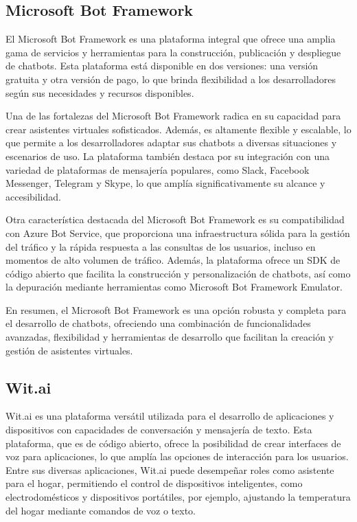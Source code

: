 \subsection{Microsoft Bot Framework}
El Microsoft Bot Framework es una plataforma integral que ofrece una amplia gama de servicios y herramientas para la construcción, publicación y despliegue de chatbots. Esta plataforma está disponible en dos versiones: una versión gratuita y otra versión de pago, lo que brinda flexibilidad a los desarrolladores según sus necesidades y recursos disponibles.

Una de las fortalezas del Microsoft Bot Framework radica en su capacidad para crear asistentes virtuales sofisticados. Además, es altamente flexible y escalable, lo que permite a los desarrolladores adaptar sus chatbots a diversas situaciones y escenarios de uso. La plataforma también destaca por su integración con una variedad de plataformas de mensajería populares, como Slack, Facebook Messenger, Telegram y Skype, lo que amplía significativamente su alcance y accesibilidad.

Otra característica destacada del Microsoft Bot Framework es su compatibilidad con Azure Bot Service, que proporciona una infraestructura sólida para la gestión del tráfico y la rápida respuesta a las consultas de los usuarios, incluso en momentos de alto volumen de tráfico. Además, la plataforma ofrece un SDK de código abierto que facilita la construcción y personalización de chatbots, así como la depuración mediante herramientas como Microsoft Bot Framework Emulator.

En resumen, el Microsoft Bot Framework es una opción robusta y completa para el desarrollo de chatbots, ofreciendo una combinación de funcionalidades avanzadas, flexibilidad y herramientas de desarrollo que facilitan la creación y gestión de asistentes virtuales.
\subsection{Wit.ai}
Wit.ai es una plataforma versátil utilizada para el desarrollo de aplicaciones y dispositivos con capacidades de conversación y mensajería de texto. Esta plataforma, que es de código abierto, ofrece la posibilidad de crear interfaces de voz para aplicaciones, lo que amplía las opciones de interacción para los usuarios. Entre sus diversas aplicaciones, Wit.ai puede desempeñar roles como asistente para el hogar, permitiendo el control de dispositivos inteligentes, como electrodomésticos y dispositivos portátiles, por ejemplo, ajustando la temperatura del hogar mediante comandos de voz o texto.

